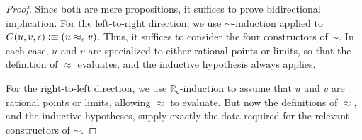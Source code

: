 \documentclass[10pt,a4paper]{article}
\newcommand{\defeq}{\vcentcolon\equiv}  %
\newcommand{\RC}{\ensuremath{\mathbb{R}_\mathsf{c}}\xspace} %
\newcommand{\closesym}{\mathord\sim}
\theoremstyle{definition}
\theoremstyle{remark}
\numberwithin{equation}{section}
\begin{document}
\begin{proof}
  Since both are mere propositions, it suffices to prove bidirectional implication.
  For the left-to-right direction, we use $\closesym$-induction applied to $C(u,v,\epsilon)\defeq (u\approx_\epsilon v)$.
  Thus, it suffices to consider the four constructors of $\closesym$.
  In each case, $u$ and $v$ are specialized to either rational points or limits, so that the definition of $\approx$ evaluates, and the inductive hypothesis always applies.

  For the right-to-left direction, we use $\RC$-induction to assume that $u$ and $v$ are rational points or limits, allowing $\approx$ to evaluate.
  But now the definitions of $\approx$, and the inductive hypotheses, supply exactly the data required for the relevant constructors of $\closesym$.
\end{proof}
\end{document}
